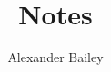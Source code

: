\documentclass[12pt]{article}
\begin{document}
\title{Notes}
\author{Alexander Bailey}
\maketitle
\end{document}
